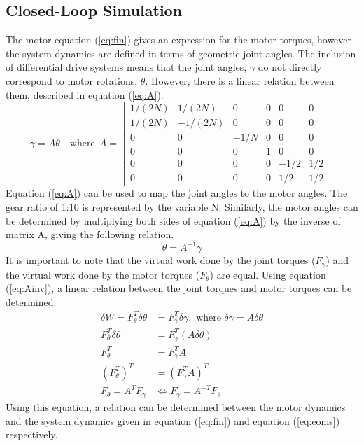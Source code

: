 \subsection{Closed-Loop Simulation}
The motor equation (\ref{eq:fin}) gives an expression for the motor torques, however the system dynamics are defined in terms of geometric joint angles. The inclusion of differential drive systems means that the joint angles, $\gamma$ do not directly correspond to motor rotations, $\theta$. However, there is a linear relation between them, described in equation (\ref{eq:A}).
\begin{equation}
  \gamma = A\theta\quad \text{where}~~A=\left[\begin{array}{cccccc}{1 /(2 N)} & {1 /(2 N)} & {0} & {0} & {0} & {0} \\ {1 /(2 N)} & {-1 /(2 N)} & {0} & {0} & {0} & {0} \\ {0} & {0} & {-1 / N} & {0} & {0} & {0} \\ {0} & {0} & {0} & {1} & {0} & {0} \\ {0} & {0} & {0} & {0} & {-1 / 2} & {1 / 2} \\ {0} & {0} & {0} & {0} & {1 / 2} & {1 / 2}\end{array}\right]
\label{eq:A}
\end{equation}
Equation (\ref{eq:A}) can be used to map the joint angles to the motor angles. The gear ratio of 1:10 is represented by the variable N. Similarly, the motor angles can be determined by multiplying both sides of equation (\ref{eq:A}) by the inverse of matrix A, giving the following relation.
\begin{equation}
\theta=A^{-1} \gamma
\label{eq:Ainv}
\end{equation}
It is important to note that the virtual work done by the joint torques ($F_{\gamma}$) and the virtual work done by the motor torques ($F_{\theta}$) are equal. Using equation (\ref{eq:Ainv}), a linear relation between the joint torques and motor torques can be determined.
\[
\begin{aligned}
  \delta W = F_{\theta}^{T} \delta \theta&=F_{\gamma}^{T} \delta \gamma, \text { where } \delta \gamma=A \delta \theta \\
  F_{\theta}^{T} \delta \theta &= F_{\gamma}^{T}(A \delta \theta) \\
  F_{\theta}^{T}&=F_{\gamma}^{T} A\\
  \left(F_{\theta}^{T}\right)^{T}&=\left(F_{\gamma}^{T} A\right)^{T}\\
  F_{\theta}=A^{T} F_{\gamma} &\Leftrightarrow F_{\gamma}=A^{-T} F_{\theta}\qquad\quad
\end{aligned}
\]
Using this equation, a relation can be determined between the motor dynamics and the system dynamics given in equation (\ref{eq:fin}) and equation (\ref{eq:eoms}) respectively.

